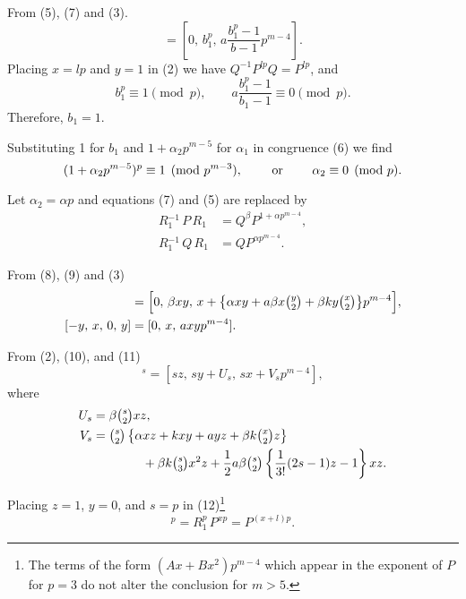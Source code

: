 \documentclass[oneside]{article}
\begin{document}
From (5), (7) and (3).
\begin{equation*}
[-p,\, 1,\, 0,\, p] = \left[0,\, b{}_1^p,\, a\frac{b{}_1^p - 1}{b - 1} p^{m-4} \right].
\end{equation*}
\noindent Placing $x = lp$ and $y = 1$ in (2) we have $Q^{-1} P^{lp} Q = P^{lp}$, and
\begin{equation*}
b{}_1^p \equiv 1 \pmod{p}, \qquad a\frac{b{}_1^p - 1}{b_1 - 1} \equiv 0
\pmod{p}.
\end{equation*}
\noindent Therefore, $b_1 = 1$.

Substituting 1 for $b_1$ and $1 + \alpha_2 p^{m-5}$ for $\alpha_1$ in
congruence (6) we find
\begin{equation*}
(1 + \alpha_2 p^{m-5})^p \equiv 1 \pmod{p^{m-3}}, \qquad \hbox{ or } \qquad
\alpha_2 \equiv 0 \pmod{p}.
\end{equation*}

Let $\alpha_2 = \alpha p$ and equations (7) and (5) are replaced by
\begin{align}
R{}_1^{-1}\, P\, R_1 &= Q^\beta P^{1 + \alpha p^{m-4}}, \\ %
R{}_1^{-1}\, Q\, R_1 &= Q P^{\alpha p^{m-4}}.              %
\end{align}

From (8), (9) and (3)
\begin{align}
[-y,\, 0,\, x,\, y] &= \Bigl[0,\, \beta xy,\, x + \bigl\{\alpha xy + a\beta x \tbinom{y}{2} +
  \beta ky\tbinom{x}{2}\bigr\}p^{m-4}\Bigr], \\ %
[-y,\, x,\, 0,\, y] &= [0,\, x,\, axyp^{m-4}].     %
\end{align}

From (2), (10), and (11)
\begin{equation}
[z,\, y,\, x]^s = [sz,\, sy + U_s,\, sx + V_s p^{m-4}], %
\end{equation}
\noindent where
\begin{align*}
U_s &= \beta \tbinom{s}{2}xz, \\
V_s &= \tbinom{s}{2}\left\{\alpha xz + kxy + ayz + \beta k\tbinom{x}{2}z\right\} \\
  & \qquad \qquad + \beta k\tbinom{s}{3}x^2 z + \frac{1}{2}a\beta\tbinom{s}{2} \left\{\frac{1}{3!}
  (2s - 1)z - 1\right\}xz.
\end{align*}

Placing $z = 1$, $y = 0$, and $s = p$ in (12)\footnote{The terms of the form
$(Ax + Bx^2)p^{m-4}$ which appear in the exponent of $P$ for $p = 3$
do not alter the conclusion for $m > 5$.}
\begin{equation*}
[R_1\, P^x]^p = R{}_1^p\, P^{xp} = P^{(x+l)p}.
\end{equation*}
\end{document}
